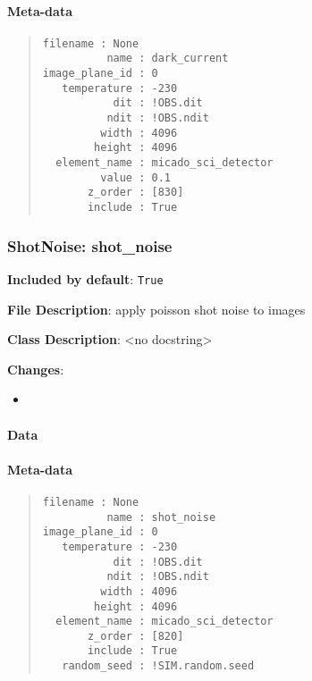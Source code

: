 \paragraph{Meta-data%
  \label{id6}%
}

\begin{quote}
\begin{alltt}
\begin{lstlisting}[frame=single]
      filename : None
          name : dark_current
image_plane_id : 0
   temperature : -230
           dit : !OBS.dit
          ndit : !OBS.ndit
         width : 4096
        height : 4096
  element_name : micado_sci_detector
         value : 0.1
       z_order : [830]
       include : True
\end{lstlisting}
\end{alltt}
\end{quote}


\subsubsection{ShotNoise: \textquotedbl{}shot\_noise\textquotedbl{}%
  \label{shotnoise-shot-noise}%
}

\textbf{Included by default}: \texttt{True}

\textbf{File Description}: apply poisson shot noise to images

\textbf{Class Description}: <no docstring>

\textbf{Changes}:

\begin{itemize}
\item \end{itemize}


\paragraph{Data%
  \label{id7}%
}


\paragraph{Meta-data%
  \label{id8}%
}

\begin{quote}
\begin{alltt}
\begin{lstlisting}[frame=single]
      filename : None
          name : shot_noise
image_plane_id : 0
   temperature : -230
           dit : !OBS.dit
          ndit : !OBS.ndit
         width : 4096
        height : 4096
  element_name : micado_sci_detector
       z_order : [820]
       include : True
   random_seed : !SIM.random.seed
\end{lstlisting}
\end{alltt}
\end{quote}


